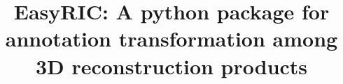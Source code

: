 \documentclass{configs/bmcart}
\begin{document}
\begin{frontmatter}

\begin{fmbox}


\title{EasyRIC: A python package for annotation transformation among 3D reconstruction products}


\author[
   addressref={aff1},
]{ }
\author[
   addressref={aff1},
   corref={aff1}, 
   email={guowei@g.ecc.u-tokyo.ac.jp}
]{ }


\address[id=aff1]{
  , 
  , 
}



\end{fmbox}
\end{frontmatter}
\end{document}

